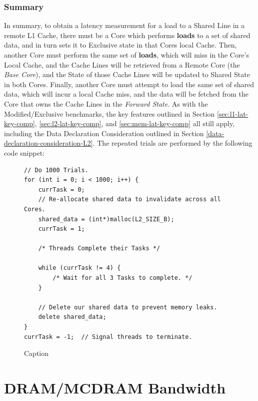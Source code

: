 \documentclass[bsc,frontabs,twoside,singlespacing,parskip,deptreport]{infthesis}     %
\begin{document}
\subsubsection{Summary}
In summary, to obtain a latency measurement for a load to a Shared Line in a remote L1 Cache, there must be a Core which performs \textbf{loads} to a set of shared data, and in turn sets it to Exclusive state in that Cores local Cache. Then, another Core must perform the same set of \textbf{loads}, which will miss in the Core's Local Cache, and the Cache Lines will be retrieved from a Remote Core (the \emph{Base Core}), and the State of those Cache Lines will be updated to Shared State in both Cores. Finally, another Core must attempt to load the same set of shared data, which will incur a local Cache miss, and the data will be fetched from the Core that owns the Cache Lines in the \textit{Forward State}. As with the Modified/Exclusive benchmarks, the key features outlined in Section \ref{sec:l1-lat-key-comp}, \ref{sec:l2-lat-key-comp}, and \ref{sec:mem-lat-key-comp} all still apply, including the Data Declaration Consideration outlined in Section \ref{data-declaration-consideration-L2}. The repeated trials are performed by the following code snippet:
\begin{figure}[!h]
    \centering
    \begin{minipage}{0.8\textwidth}
    \begin{verbatim}
// Do 1000 Trials.
for (int i = 0; i < 1000; i++) {
    currTask = 0;
    // Re-allocate shared data to invalidate across all Cores.
    shared_data = (int*)malloc(L2_SIZE_B);
    currTask = 1;

    /* Threads Complete their Tasks */
        
    while (currTask != 4) {
        /* Wait for all 3 Tasks to complete. */
    }

    // Delete our shared data to prevent memory leaks.
    delete shared_data;
}
currTask = -1;  // Signal threads to terminate.
    \end{verbatim}
    \end{minipage}
    \caption{Caption}
    \label{fig:remote-S-repeat}
\end{figure}

\newpage


\section{DRAM/MCDRAM Bandwidth}\label{mcdram-dram-benchmarks-bw}
\end{document}
